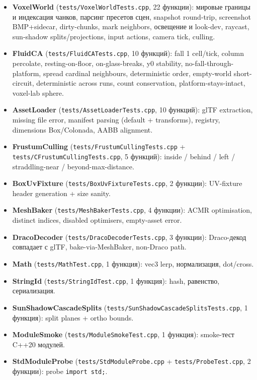 \begin{itemize}
\tightlist
\item
  \textbf{VoxelWorld} (\texttt{tests/VoxelWorldTests.cpp}, 22 функции): мировые границы и индексация чанков, парсинг пресетов сцен, snapshot round-trip, screenshot BMP+sidecar, dirty-chunks, mark neighbors, освещение и look-dev, raycast, sun-shadow splits/projections, input actions, camera tick, culling.
\item
  \textbf{FluidCA} (\texttt{tests/FluidCATests.cpp}, 10 функций): fall 1 cell/tick, column percolate, resting-on-floor, on-glass-breaks, y0 stability, no-fall-through-platform, spread cardinal neighbours, deterministic order, empty-world short-circuit, deterministic across runs, count conservation, platform-stays-intact, voxel-lab sphere.
\item
  \textbf{AssetLoader} (\texttt{tests/AssetLoaderTests.cpp}, 10 функций): glTF extraction, missing file error, manifest parsing (default + transforms), registry, dimensions Box/Colonada, AABB alignment.
\item
  \textbf{FrustumCulling} (\texttt{tests/FrustumCullingTests.cpp} + \texttt{tests/CFrustumCullingTests.cpp}, 5 функций): inside / behind / left / straddling-near / beyond-max-distance.
\item
  \textbf{BoxUvFixture} (\texttt{tests/BoxUvFixtureTests.cpp}, 2 функции): UV-fixture header generation + size sanity.
\item
  \textbf{MeshBaker} (\texttt{tests/MeshBakerTests.cpp}, 4 функции): ACMR optimisation, distinct indices, disabled optimisers, empty-asset error.
\item
  \textbf{DracoDecoder} (\texttt{tests/DracoDecoderTests.cpp}, 3 функции): Draco-декод совпадает с glTF, bake-via-MeshBaker, non-Draco path.
\item
  \textbf{Math} (\texttt{tests/MathTest.cpp}, 1 функция): vec3 lerp, нормализация, dot/cross.
\item
  \textbf{StringId} (\texttt{tests/StringIdTest.cpp}, 1 функция): hash, равенство, сериализация.
\item
  \textbf{SunShadowCascadeSplits} (\texttt{tests/SunShadowCascadeSplitsTests.cpp}, 1 функция): split planes + ortho bounds.
\item
  \textbf{ModuleSmoke} (\texttt{tests/ModuleSmokeTest.cpp}, 1 функция): smoke-тест C++20 модулей.
\item
  \textbf{StdModuleProbe} (\texttt{tests/StdModuleProbe.cpp} + \texttt{tests/ProbeTest.cpp}, 2 функции): probe \texttt{import\ std;}.
\end{itemize}


